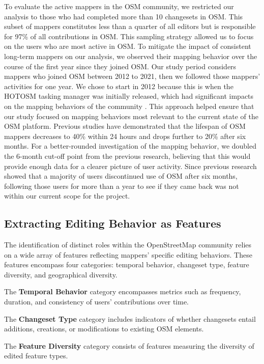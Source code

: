 \documentclass[manuscript,screen,review]{acmart}
\begin{document}
To evaluate the active mappers in the OSM community, we restricted our analysis to those who had completed more than 10 changesets in OSM. This subset of mappers constitutes less than a quarter of all editors but is responsible for 97\% of all contributions in OSM. This sampling strategy allowed us to focus on the users who are most active in OSM. To mitigate the impact of consistent long-term mappers on our analysis, we observed their mapping behavior over the course of the first year since they joined OSM. Our study period considers mappers who joined OSM between 2012 to 2021, then we followed those mappers' activities for one year. We chose to start in 2012 because this is when the HOTOSM tasking manager was initially released, which had significant impacts on the mapping behaviors of the community \cite{herfort2021evolution}. This approach helped ensure that our study focused on mapping behaviors most relevant to the current state of the OSM platform. Previous studies\cite{BeginDR18} have demonstrated that the lifespan of OSM mappers decreases to 40\% within 24 hours and drops further to 20\% after six months. For a better-rounded investigation of the mapping behavior, we doubled the 6-month cut-off point from the previous research, believing that this would provide enough data for a clearer picture of user activity. Since previous research showed that a majority of users discontinued use of OSM after six months, following those users for more than a year to see if they came back was not within our current scope for the project. 

\subsection{Extracting Editing Behavior as Features} \label{feature_group}

The identification of distinct roles within the OpenStreetMap community relies on a wide array of features reflecting mappers' specific editing behaviors. These features encompass four categories: temporal behavior, changeset type, feature diversity, and geographical diversity.

The \textbf{Temporal Behavior} category encompasses metrics such as frequency, duration, and consistency of users' contributions over time. 

The \textbf{Changeset Type} category includes indicators of whether changesets entail additions, creations, or modifications to existing OSM elements.

The \textbf{Feature Diversity} category consists of features measuring the diversity of edited feature types.
\end{document}
